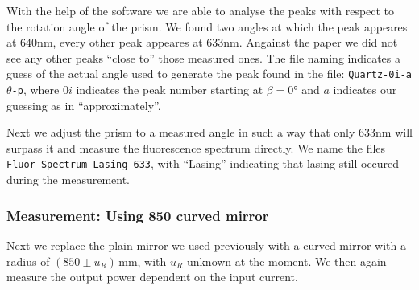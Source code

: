 \documentclass[../../main.tex]{subfiles}
\begin{document}
        With the help of the software we are able to analyse the peaks with respect to the rotation angle of the prism. We found two angles at which the peak appeares at $640\si{\nm}$, every other peak appeares at $633\si{\nm}$. Angainst the paper we did not see any other peaks \enquote{close to} those measured ones. The file naming indicates a guess of the actual angle used to generate the peak found in the file: \texttt{Quartz-0i-a}$\theta$\texttt{-p}, where $0i$ indicates the peak number starting at $\beta=0\si{\degree}$ and $a$ indicates our guessing as in \enquote{approximately}. 

        Next we adjust the prism to a measured angle in such a way that only $633\si{\nm}$ will surpass it and measure the fluorescence spectrum directly. We name the files \texttt{Fluor-Spectrum-Lasing-633}, with \enquote{Lasing} indicating that lasing still occured during the measurement.

    \subsubsection{Measurement: Using 850 curved mirror}
        Next we replace the plain mirror we used previously with a curved mirror with a radius of $(850\pm u_R)\,\si{\mm}$, with $u_R$ unknown at the moment. We then again measure the output power dependent on the input current. 
\end{document}
